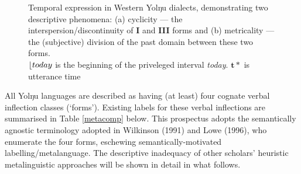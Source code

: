 \documentclass[12pt]{article}
\begin{document}
\begin{figure}[h]\centering\caption{Temporal expression in Western Yolŋu dialects, demonstrating two descriptive phenomena: (a) cyclicity --- the interspersion/discontinuity of \textbf{I} and \textbf{III} forms and (b) metricality --- the (subjective) division of the past domain between these two forms.\\$\lfloor{\sl today}$ is the beginning of the priveleged interval {\sl today}. $\boldsymbol{t*}$ is utterance time}\label{funnytense}
	\end{figure}


All Yolŋu languages are described as having (at least) four cognate verbal inflection classes (`forms'). Existing labels for these verbal inflections are summarised in Table \ref{metacomp} below. This prospectus adopts the semantically agnostic terminology adopted in Wilkinson (1991) and Lowe (1996), who enumerate the four forms, eschewing semantically-motivated labelling/metalanguage. The descriptive inadequacy of other scholars' heuristic metalinguistic approaches will be shown in detail in what follows. %
 
\end{document}
